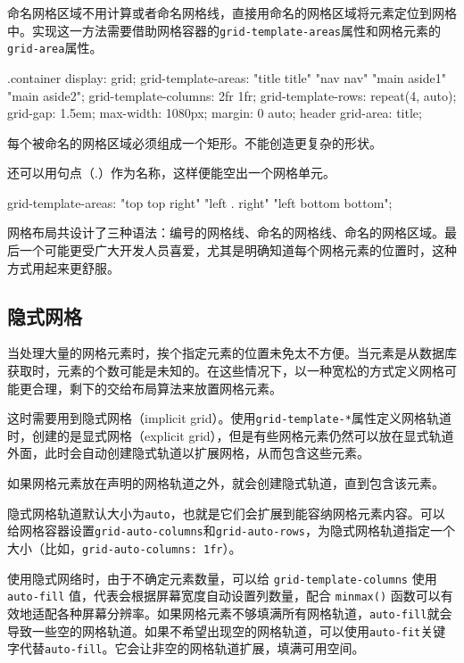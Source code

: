命名网格区域不用计算或者命名网格线，直接用命名的网格区域将元素定位到网格中。实现这一方法需要借助网格容器的\texttt{grid-template-areas}属性和网格元素的\texttt{grid-area}属性。

\begin{HTML}
.container {   
    display: grid;   
    grid-template-areas: "title title"                       
                        "nav   nav"                        
                        "main  aside1"                        
                        "main  aside2";   
    grid-template-columns: 2fr 1fr;  
    grid-template-rows: repeat(4, auto); 
    grid-gap: 1.5em;   
    max-width: 1080px;   
    margin: 0 auto; 
} 
header {   
    grid-area: title;
} 
\end{HTML}

每个被命名的网格区域必须组成一个矩形。不能创造更复杂的形状。

还可以用句点（.）作为名称，这样便能空出一个网格单元。

\begin{HTML}
grid-template-areas: "top  top right"
                     "left . right"
                     "left bottom bottom";
\end{HTML}

网格布局共设计了三种语法：编号的网格线、命名的网格线、命名的网格区域。最后一个可能更受广大开发人员喜爱，尤其是明确知道每个网格元素的位置时，这种方式用起来更舒服。

\subsection{隐式网格}

当处理大量的网格元素时，挨个指定元素的位置未免太不方便。当元素是从数据库获取时，元素的个数可能是未知的。在这些情况下，以一种宽松的方式定义网格可能更合理，剩下的交给布局算法来放置网格元素。

这时需要用到隐式网格（implicit  grid）。使用\texttt{grid-template-*}属性定义网格轨道时，创建的是显式网格（explicit  grid），但是有些网格元素仍然可以放在显式轨道外面，此时会自动创建隐式轨道以扩展网格，从而包含这些元素。

如果网格元素放在声明的网格轨道之外，就会创建隐式轨道，直到包含该元素。

隐式网格轨道默认大小为\texttt{auto}，也就是它们会扩展到能容纳网格元素内容。可以给网格容器设置\texttt{grid-auto-columns}和\texttt{grid-auto-rows}，为隐式网格轨道指定一个大小（比如，\texttt{grid-auto-columns: 1fr}）。

使用隐式网络时，由于不确定元素数量，可以给 \texttt{grid-template-columns} 使用 \texttt{auto-fill} 值，代表会根据屏幕宽度自动设置列数量，配合 \texttt{minmax()} 函数可以有效地适配各种屏幕分辨率。如果网格元素不够填满所有网格轨道，\texttt{auto-fill}就会导致一些空的网格轨道。如果不希望出现空的网格轨道，可以使用\texttt{auto-fit}关键字代替\texttt{auto-fill}。它会让非空的网格轨道扩展，填满可用空间。

